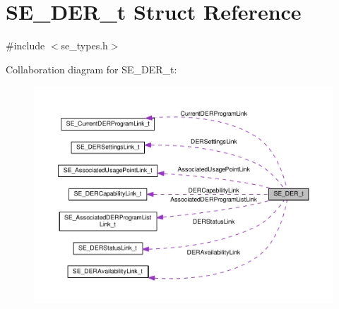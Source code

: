 \hypertarget{structSE__DER__t}{}\section{S\+E\+\_\+\+D\+E\+R\+\_\+t Struct Reference}
\label{structSE__DER__t}


{\ttfamily \#include $<$se\+\_\+types.\+h$>$}



Collaboration diagram for S\+E\+\_\+\+D\+E\+R\+\_\+t\+:\nopagebreak
\begin{figure}[H]
\begin{center}
\leavevmode
\includegraphics[width=350pt]{structSE__DER__t__coll__graph}
\end{center}
\end{figure}
